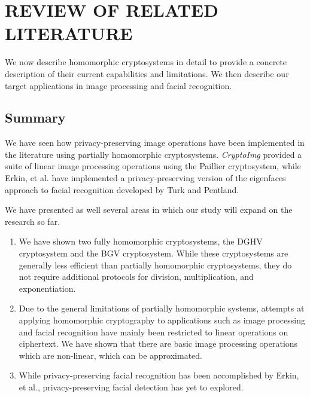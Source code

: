 \chapter{REVIEW OF RELATED LITERATURE}

We now describe homomorphic cryptosystems in detail to provide a concrete description of their current capabilities and limitations. We then describe our target applications in image processing and facial recognition.









\section{Summary}
We have seen how privacy-preserving image operations have been implemented in the literature using partially homomorphic cryptosystems. \textit{CryptoImg} provided a suite of linear image processing operations using the Paillier cryptosystem, while Erkin, et al. have implemented a privacy-preserving version of the eigenfaces approach to facial recognition developed by Turk and Pentland.

We have presented as well several areas in which our study will expand on the research so far.
\begin{enumerate}
  \item We have shown two fully homomorphic cryptosystems, the DGHV cryptosystem and the BGV cryptosystem. While these cryptosystems are generally less efficient than partially homomorphic cryptosystems, they do not require additional protocols for division, multiplication, and exponentiation.
  \item Due to the general limitations of partially homomorphic systems, attempts at applying homomorphic cryptography to applications such as image processing and facial recognition have mainly been restricted to linear operations on ciphertext. We have shown that there are basic image processing operations which are non-linear, which can be approximated.
  \item While privacy-preserving facial recognition has been accomplished by Erkin, et al., privacy-preserving facial detection has yet to explored.
\end{enumerate}
